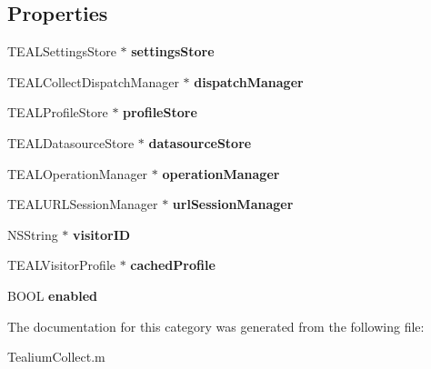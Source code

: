 \subsection*{Properties}
\begin{DoxyCompactItemize}
\item 
\hypertarget{category_tealium_collect_07_08_aec8a4b574547743e8718591b76418dfa}{}T\+E\+A\+L\+Settings\+Store $\ast$ {\bfseries settings\+Store}\label{category_tealium_collect_07_08_aec8a4b574547743e8718591b76418dfa}

\item 
\hypertarget{category_tealium_collect_07_08_a5fe505345005d2dcd619b41f86fb7e0f}{}T\+E\+A\+L\+Collect\+Dispatch\+Manager $\ast$ {\bfseries dispatch\+Manager}\label{category_tealium_collect_07_08_a5fe505345005d2dcd619b41f86fb7e0f}

\item 
\hypertarget{category_tealium_collect_07_08_a405f95e8e980383aa16d498ba5fe3541}{}T\+E\+A\+L\+Profile\+Store $\ast$ {\bfseries profile\+Store}\label{category_tealium_collect_07_08_a405f95e8e980383aa16d498ba5fe3541}

\item 
\hypertarget{category_tealium_collect_07_08_a7ec13629c5a3bc81c0e8ac34b14a2a7c}{}T\+E\+A\+L\+Datasource\+Store $\ast$ {\bfseries datasource\+Store}\label{category_tealium_collect_07_08_a7ec13629c5a3bc81c0e8ac34b14a2a7c}

\item 
\hypertarget{category_tealium_collect_07_08_a5f016b0c3f0c571354b8f1e7f7b70e6a}{}T\+E\+A\+L\+Operation\+Manager $\ast$ {\bfseries operation\+Manager}\label{category_tealium_collect_07_08_a5f016b0c3f0c571354b8f1e7f7b70e6a}

\item 
\hypertarget{category_tealium_collect_07_08_abf9b6a5a2b94a3b22395afe9bd3c5c5d}{}T\+E\+A\+L\+U\+R\+L\+Session\+Manager $\ast$ {\bfseries url\+Session\+Manager}\label{category_tealium_collect_07_08_abf9b6a5a2b94a3b22395afe9bd3c5c5d}

\item 
\hypertarget{category_tealium_collect_07_08_adba0d45acf9528df431a4012a963050c}{}N\+S\+String $\ast$ {\bfseries visitor\+I\+D}\label{category_tealium_collect_07_08_adba0d45acf9528df431a4012a963050c}

\item 
\hypertarget{category_tealium_collect_07_08_a8291122081db8a48ed3f3bc6d9def85e}{}T\+E\+A\+L\+Visitor\+Profile $\ast$ {\bfseries cached\+Profile}\label{category_tealium_collect_07_08_a8291122081db8a48ed3f3bc6d9def85e}

\item 
\hypertarget{category_tealium_collect_07_08_ac709770f5bb33c8b3957e155bbbd86c6}{}B\+O\+O\+L {\bfseries enabled}\label{category_tealium_collect_07_08_ac709770f5bb33c8b3957e155bbbd86c6}

\end{DoxyCompactItemize}


The documentation for this category was generated from the following file\+:\begin{DoxyCompactItemize}
\item 
Tealium\+Collect.\+m\end{DoxyCompactItemize}

